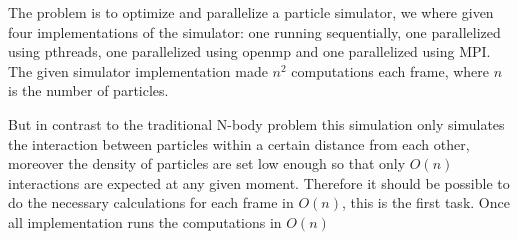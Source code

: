 
    The problem is to optimize and parallelize a particle simulator, we
    where given four implementations of the simulator: one running sequentially,
    one parallelized using pthreads, one parallelized using openmp and one
    parallelized using MPI. The given simulator implementation made $n^2$
    computations each frame, where $n$ is the number of particles.

    But in contrast to the traditional N-body problem this simulation only
    simulates the interaction between particles within a certain distance from
    each other, moreover the density of particles are set low enough so that
    only $O(n)$ interactions are expected at any given moment. Therefore it
    should be possible to do the necessary calculations for each frame in
    $O(n)$, this is the first task. Once all implementation runs the
    computations in $O(n)$ %

